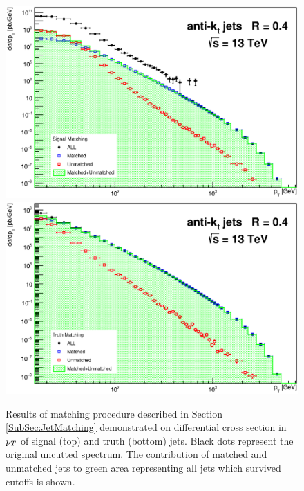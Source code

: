 \begin{appendices}
\begin{figure}[p]
  \centering
  \includegraphics[width=\textwidth]{Chapter3/SignalMatching.eps}
  \includegraphics[width=\textwidth]{Chapter3/TruthMatching.eps}
  \caption{Results of matching procedure described in Section
  \ref{SubSec:JetMatching} demonstrated on differential cross section in $p_{T}$ of
  signal (top) and truth (bottom) jets. Black dots represent the original
  uncutted spectrum. The contribution of matched and unmatched jets to
  green area representing all jets which survived cutoffs is shown.}
  \label{fig:Matching}
\end{figure}


\end{appendices}
